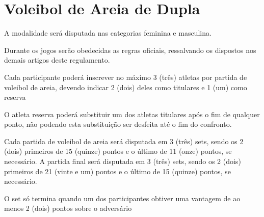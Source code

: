 {\let\clearpage\relax \chapter{Voleibol de Areia de Dupla}}

\begin{article}
	A modalidade será disputada nas categorias feminina e masculina.
\end{article}

\begin{article}
	Durante os jogos serão obedecidas as regras oficiais, ressalvando os dispostos nos demais artigos deste regulamento.
\end{article}

\begin{article}
	Cada participante poderá inscrever no máximo 3 (três) atletas por partida de voleibol de areia, devendo indicar 2 (dois) deles como titulares e 1 (um) como reserva

	\begin{xparagraph}
		O atleta reserva poderá substituir um dos atletas titulares após o fim de qualquer ponto, não podendo esta substituição ser desfeita até o fim do confronto.
	\end{xparagraph}
\end{article}

\begin{article}
	Cada partida de voleibol de areia será disputada em 3 (três) sets, sendo os 2 (dois) primeiros de 15 (quinze) pontos e o último de 11 (onze) pontos, se necessário. A partida final será disputada em 3 (três) sets, sendo os 2 (dois) primeiros de 21 (vinte e um) pontos e o último de 15 (quinze) pontos, se necessário.

	\begin{xparagraph}
		O set só termina quando um dos participantes obtiver uma vantagem de ao menos 2 (dois) pontos sobre o adversário
	\end{xparagraph}
\end{article}
